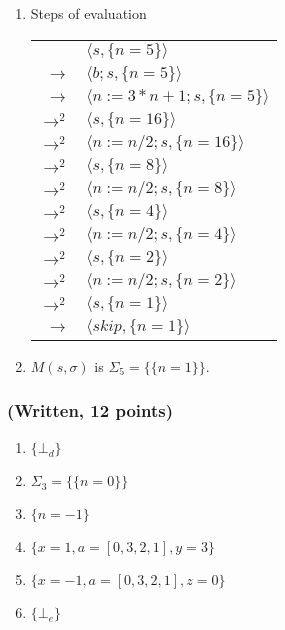 \documentclass{article}
\newcommand{\prog}[2]{\langle #1, #2 \rangle}
\begin{document}
\begin{enumerate}
    \item Steps of evaluation
        \begin{center}
            \begin{tabular}{r l}
                                    &$\prog{s}{\{n = 5\}}$ \\
                $\rightarrow$       &$\prog{b;s}{\{n = 5\}}$ \\
                $\rightarrow$       &$\prog{n := 3 * n + 1; s}{\{n = 5\}}$ \\
                $\rightarrow^2$     &$\prog{s}{\{n = 16\}}$ \\
                $\rightarrow^2$     &$\prog{n := n / 2; s}{\{n = 16\}}$ \\
                $\rightarrow^2$     &$\prog{s}{\{n = 8\}}$ \\
                $\rightarrow^2$     &$\prog{n := n / 2; s}{\{n = 8\}}$ \\
                $\rightarrow^2$     &$\prog{s}{\{n = 4\}}$ \\
                $\rightarrow^2$     &$\prog{n := n / 2; s}{\{n = 4\}}$ \\
                $\rightarrow^2$     &$\prog{s}{\{n = 2\}}$ \\
                $\rightarrow^2$     &$\prog{n := n / 2; s}{\{n = 2\}}$ \\
                $\rightarrow^2$     &$\prog{s}{\{n = 1\}}$ \\
                $\rightarrow$       &$\prog{skip}{\{n = 1\}}$ \\
            \end{tabular}
        \end{center}

    \item $M(s, \sigma)$ is $\Sigma_5 = \{\{ n = 1\}\}$.
\end{enumerate}

\subsubsection{(Written, 12 points)}

\begin{enumerate}
    \item $\{\bot_d\}$
    \item $\Sigma_3 = \{\{n = 0\}\}$
    \item $\{n = -1\}$
    \item $\{x = 1, a = [0, 3, 2, 1], y = 3\}$
    \item $\{x = -1, a = [0, 3, 2, 1], z = 0\}$
    \item $\{\bot_e\}$
\end{enumerate}
\end{document}
